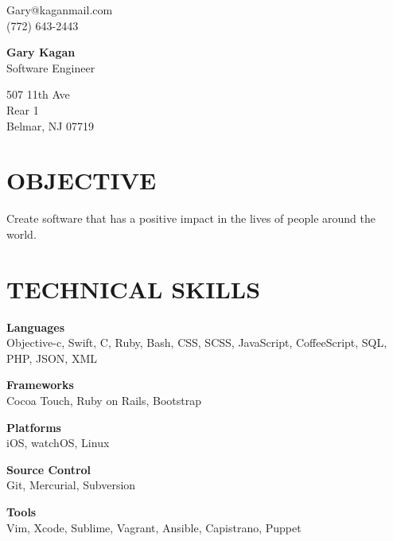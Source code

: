 \documentclass{res}
\begin{document}
 
\begin{multicols}{3}
\begin{flushleft}
Gary@kaganmail.com\\[0.3em]
(772) 643-2443
\end{flushleft}
\columnbreak
\begin{center}
{\huge\textbf{Gary Kagan}}\\
Software Engineer
\end{center}
\columnbreak
\begin{flushright}
507 11th Ave\\
Rear 1\\
Belmar, NJ 07719
\end{flushright}
\end{multicols}


\begin{resume}
\section{OBJECTIVE}          
    Create software that has a positive impact in the lives of people around the world.

\section{TECHNICAL SKILLS}
    \textbf{Languages}\\
    Objective-c, Swift, C, Ruby, Bash, CSS, SCSS, JavaScript, CoffeeScript, SQL, PHP, JSON, XML

    \begin{multicols}{2}
    \begin{flushleft}
    \textbf{Frameworks}\\
    Cocoa Touch, Ruby on Rails, Bootstrap
    \end{flushleft}
    \columnbreak
    \textbf{Platforms}\\
    iOS, watchOS, Linux
    \end{multicols}

    \begin{multicols}{2}
    \begin{flushleft}
    \textbf{Source Control}\\
    Git, Mercurial, Subversion
    \end{flushleft}
    \columnbreak
    \textbf{Tools}\\
    Vim, Xcode, Sublime, Vagrant, Ansible, Capistrano, Puppet
    \end{multicols}



\end{resume}
\end{document}
